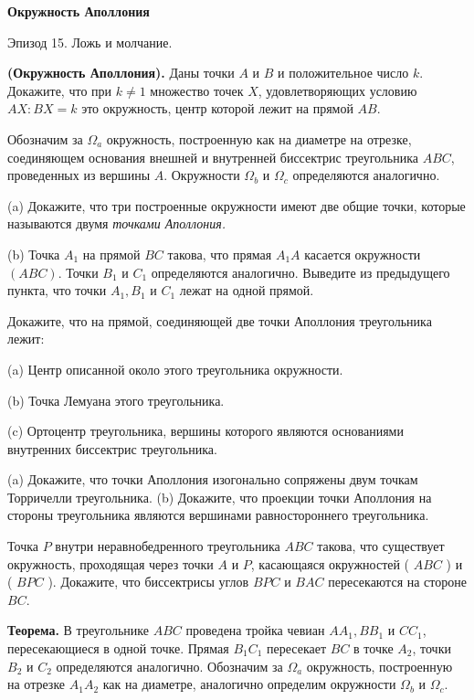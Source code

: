 \centerline{\bf \Huge Окружность Аполлония}

\begin{flushright}
        \scriptsize{Эпизод 15. Ложь и молчание.}
\end{flushright}

\textbf{(Окружность Аполлония).} Даны точки $A$ и $B$ и положительное число $k$. Докажите, что при $k \neq 1$ множество точек $X$, удовлетворяющих условию $A X: B X=k$ это окружность, центр которой лежит на прямой $A B$.

Обозначим за $\Omega_a$ окружность, построенную как на диаметре на отрезке, соединяющем основания внешней и внутренней биссектрис треугольника $A B C$, проведенных из вершины $A$. Окружности $\Omega_b$ и $\Omega_c$ определяются аналогично.

(a) Докажите, что три построенные окружности имеют две общие точки, которые называются двумя \textit{точками Аполлония.}

(b) Точка $A_1$ на прямой $B C$ такова, что прямая $A_1 A$ касается окружности $(A B C)$. Точки $B_1$ и $C_1$ определяются аналогично. Выведите из предыдущего пункта, что точки $A_1, B_1$ и $C_1$ лежат на одной прямой.

Докажите, что на прямой, соединяющей две точки Аполлония треугольника лежит:

(a) Центр описанной около этого треугольника окружности.

(b) Точка Лемуана этого треугольника.

(c) Ортоцентр треугольника, вершины которого являются основаниями внутренних биссектрис треугольника.


(a) Докажите, что точки Аполлония изогонально сопряжены двум точкам Торричелли треугольника.
(b) Докажите, что проекции точки Аполлония на стороны треугольника являются вершинами равностороннего треугольника.

Точка $P$ внутри неравнобедренного треугольника $A B C$ такова, что существует окружность, проходящая через точки $A$ и $P$, касающаяся окружностей ( $A B C$ ) и ( $B P C$ ). Докажите, что биссектрисы углов $B P C$ и $B A C$ пересекаются на стороне $B C$.

\newpage

\hspace{3mm}

\textbf{Теорема.} В треугольнике $A B C$ проведена тройка чевиан $A A_1, B B_1$ и $C C_1$, пересекающиеся в одной точке. Прямая $B_1 C_1$ пересекает $B C$ в точке $A_2$, точки $B_2$ и $C_2$ определяются аналогично. Обозначим за $\Omega_a$ окружность, построенную на отрезке $A_1 A_2$ как на диаметре, аналогично определим окружности $\Omega_b$ и $\Omega_c$.

